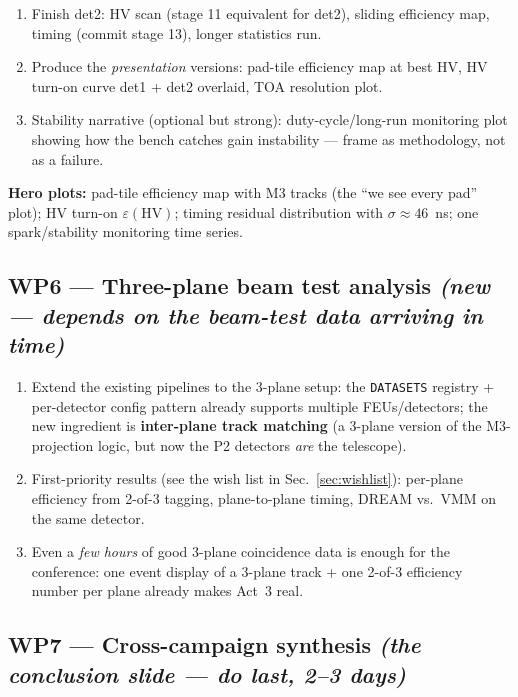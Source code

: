 \documentclass[11pt,a4paper]{article}
\newcommand{\code}[1]{\texttt{#1}}
\begin{document}
\begin{enumerate}[itemsep=1pt]
  \item Finish det2: HV scan (stage 11 equivalent for det2), sliding
    efficiency map, timing (commit stage 13), longer statistics run.
  \item Produce the \emph{presentation} versions: pad-tile efficiency map at
    best HV, HV turn-on curve det1 + det2 overlaid, TOA resolution plot.
  \item Stability narrative (optional but strong): duty-cycle/long-run
    monitoring plot showing how the bench catches gain instability --- frame
    as methodology, not as a failure.
\end{enumerate}

\textbf{Hero plots:} pad-tile efficiency map with M3 tracks (the ``we see
every pad'' plot); HV turn-on $\varepsilon(\mathrm{HV})$; timing residual
distribution with $\sigma \approx 46$~ns; one spark/stability monitoring time
series.

\subsection*{WP6 --- Three-plane beam test analysis \emph{(new --- depends on the beam-test data arriving in time)}}

\begin{enumerate}[itemsep=1pt]
  \item Extend the existing pipelines to the 3-plane setup: the \code{DATASETS}
    registry + per-detector config pattern already supports multiple
    FEUs/detectors; the new ingredient is \textbf{inter-plane track matching}
    (a 3-plane version of the M3-projection logic, but now the P2 detectors
    \emph{are} the telescope).
  \item First-priority results (see the wish list in Sec.~\ref{sec:wishlist}):
    per-plane efficiency from 2-of-3 tagging, plane-to-plane timing, DREAM
    vs.\ VMM on the same detector.
  \item Even a \emph{few hours} of good 3-plane coincidence data is enough for
    the conference: one event display of a 3-plane track + one 2-of-3
    efficiency number per plane already makes Act~3 real.
\end{enumerate}

\subsection*{WP7 --- Cross-campaign synthesis \emph{(the conclusion slide --- do last, 2--3 days)}}
\end{document}

